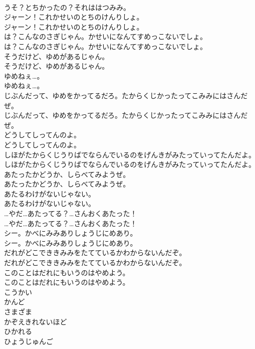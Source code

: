 \documentclass[8pt]{extreport}
\begin{document}
\begin{CJK}{UTF8}{min}
\\	うそ？とちかったの？それははつみみ。 
\\	ジャーン！これかせいのとちのけんりしょ。	
\\	ジャーン！これかせいのとちのけんりしょ。 
\\	は？こんなのさぎじゃん。かせいになんてすめっこないでしょ。	
\\	は？こんなのさぎじゃん。かせいになんてすめっこないでしょ。 
\\	そうだけど、ゆめがあるじゃん。	
\\	そうだけど、ゆめがあるじゃん。 
\\	ゆめねぇ…。	
\\	ゆめねぇ…。 
\\	じぶんだって、ゆめをかってるだろ。たからくじかったってこみみにはさんだぜ。	
\\	じぶんだって、ゆめをかってるだろ。たからくじかったってこみみにはさんだぜ。 
\\	どうしてしってんのよ。	
\\	どうしてしってんのよ。 
\\	しほがたからくじうりばでならんでいるのをげんきがみたっていってたんだよ。	
\\	しほがたからくじうりばでならんでいるのをげんきがみたっていってたんだよ。 
\\	あたったかどうか、しらべてみようぜ。	
\\	あたったかどうか、しらべてみようぜ。 
\\	あたるわけがないじゃない。	
\\	あたるわけがないじゃない。 
\\	…やだ…あたってる？…さんおくあたった！	
\\	…やだ…あたってる？…さんおくあたった！ 
\\	シー。かべにみみありしょうじにめあり。	
\\	シー。かべにみみありしょうじにめあり。 
\\	だれがどこでききみみをたてているかわからないんだぞ。	
\\	だれがどこでききみみをたてているかわからないんだぞ。 
\\	このことはだれにもいうのはやめよう。	
\\	このことはだれにもいうのはやめよう。 
\\	こうかい
\\	かんど
\\	さまざま
\\	かぞえきれないほど
\\	ひかれる
\\	ひょうじゅんご

\end{CJK}
\end{document}
